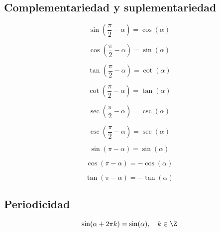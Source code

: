 \subsection{Complementariedad y suplementariedad}

\begin{proposición}
$$\sin\left(\frac{\pi}{2} - \alpha\right) = \cos(\alpha)$$
\end{proposición}

\begin{proposición}
$$\cos\left(\frac{\pi}{2} - \alpha\right) = \sin(\alpha)$$
\end{proposición}

\begin{proposición}
$$\tan\left(\frac{\pi}{2} - \alpha\right) = \cot(\alpha)$$
\end{proposición}

\begin{proposición}
$$\cot\left(\frac{\pi}{2} - \alpha\right) = \tan(\alpha)$$
\end{proposición}

\begin{proposición}
$$\sec\left(\frac{\pi}{2} - \alpha\right) = \csc(\alpha)$$
\end{proposición}

\begin{proposición}
$$\csc\left(\frac{\pi}{2} - \alpha\right) = \sec(\alpha)$$
\end{proposición}

\begin{proposición}
$$\sin(\pi - \alpha) = \sin(\alpha)$$
\end{proposición}

\begin{proposición}
$$\cos(\pi - \alpha) = -\cos(\alpha)$$
\end{proposición}

\begin{proposición}
$$\tan(\pi - \alpha) = -\tan(\alpha)$$
\end{proposición}

\subsection{Periodicidad}

\begin{proposición}
$$\sin(\alpha + 2\pi k) = \sin(\alpha), \quad k \in \Z$$
\end{proposición}

